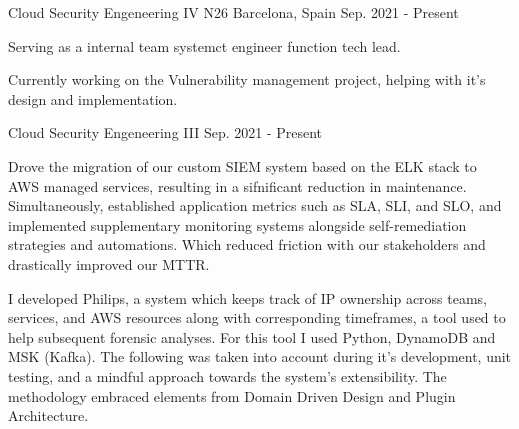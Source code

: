 
\begin{cventries}
\cventry
{Cloud Security Engeneering IV} %
{N26} %
{Barcelona, Spain} %
{Sep. 2021 - Present} %
{
\begin{cvitems} %
\item {Serving as a internal team systemct engineer function tech lead.}
\item {Currently working on the Vulnerability management project, helping with it's design and implementation.}
\end{cvitems}
}

\cventry
{Cloud Security Engeneering III} %
{} %
{} %
{Sep. 2021 - Present} %
{
\begin{cvitems} %
\item {Drove the migration of our custom SIEM system based on the ELK stack to AWS managed services, resulting in a sifnificant reduction in maintenance. Simultaneously, established application metrics such as SLA, SLI, and SLO, and implemented supplementary monitoring systems alongside self-remediation strategies and automations. Which reduced friction with our stakeholders and drastically improved our MTTR.}
\item {I developed Philips, a system which keeps track of IP ownership across teams, services, and AWS resources along with corresponding timeframes, a tool used to help subsequent forensic analyses. For this tool I used Python, DynamoDB and MSK (Kafka). The following was taken into account during it's development, unit testing, and a mindful approach towards the system's extensibility. The methodology embraced elements from Domain Driven Design and Plugin Architecture.}
\end{cvitems}
}


\end{cventries}
